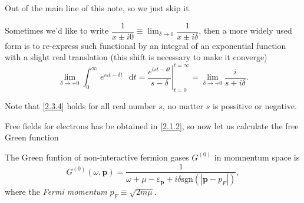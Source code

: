 \documentclass[b5paper,10pt,UTF8]{book}
\newcommand*\dd{\mathop{}\!\mathrm{d}}
\numberwithin{equation}{section}
\begin{document}
			\begin{Proof}
				Out of the main line of this note, so we just skip it.
			\end{Proof}
			Sometimes we'd like to write $\dfrac{1}{x\pm i0}\equiv\displaystyle\lim_{\delta\rightarrow0}\dfrac{1}{x\pm i\delta}$, then a more widely used form is to re-express such functional by an integral of an exponential function with a slight real translation (this shift is necessary to make it converge)
			\begin{equation}\label{2.3.4}
				\lim_{\delta\rightarrow+0}\int_0^\infty\,e^{ist-\delta t}\,\dd t=\left.\dfrac{e^{ist-\delta t}}{s-\delta}\right|_{t=0}^{t=\infty}=\lim_{\delta\rightarrow+0}\dfrac{i}{s+ i\delta}.
			\end{equation}
			\begin{Note}
				Note that \eqref{2.3.4} holds for all real number $s$, no matter $s$ is possitive or negative.
			\end{Note}
			Free fields for electrons has be obtained in \eqref{2.1.2}, so now let us calculate the free Green function
			\begin{Proposition}
				The Green funtion of non-interactive fermion gases $G^{(0)}$ in momnentum space is
				\begin{equation}\label{2.3.5}
					G^{(0)}(\omega,\bm{p})=\dfrac{1}{\omega+\mu-\varepsilon_{\bm{p}}+i\delta\mathrm{sgn}(|\bm{p}-p_F|)},
				\end{equation}
				where the \emph{Fermi momentum} $p_F\equiv\sqrt{2m\mu}$.
			\end{Proposition}
\end{document}
